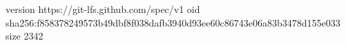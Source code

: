 version https://git-lfs.github.com/spec/v1
oid sha256:f858378249573b49dbf8f038dafb3940d93ee60c86743e06a83b3478d155e033
size 2342
